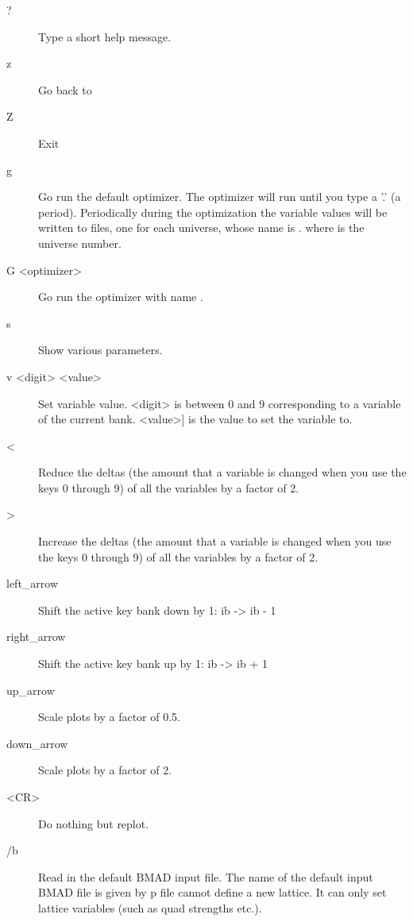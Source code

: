 \begin{description}
\item[?]
Type a short help message.

\item[z] 
Go back to 

\item[Z] 
Exit \tao
                                        
\item[g]
Go run the default optimizer. The optimizer will run until you type a 
'.' (a period).
Periodically during the optimization the variable values
will be written to files, one for each universe, whose name is 
. where \vn{\#} is the universe number.

\item[G <optimizer>]
Go run the optimizer with name .

\item[s]  
Show various parameters.

\item[v <digit> <value>]
Set variable value. <digit> is between 0 and 9 corresponding
to a variable of the current bank. <value>] is the value to set the
variable to.

\item[<]
Reduce the deltas (the amount that a variable is changed when you use the
keys 0 through 9) of all the variables by a factor of 2.

\item[>]
Increase the deltas (the amount that a variable is changed when you use
the keys 0 through 9) of all the variables by a factor of 2.

\item[left\_arrow]
Shift the active key bank down by 1: ib -> ib - 1

\item[right\_arrow]
Shift the active key bank up by 1: ib -> ib + 1

\item[up\_arrow]
Scale plots by a factor of 0.5.

\item[down\_arrow]
Scale plots by a factor of 2.

\item[<CR>]
Do nothing but replot.

\item[/b] 
Read in the default BMAD input file.
The name of the default input BMAD file is given by p%
file cannot define a new lattice. It can only set lattice variables (such as
quad strengths etc.).


\end{description}

